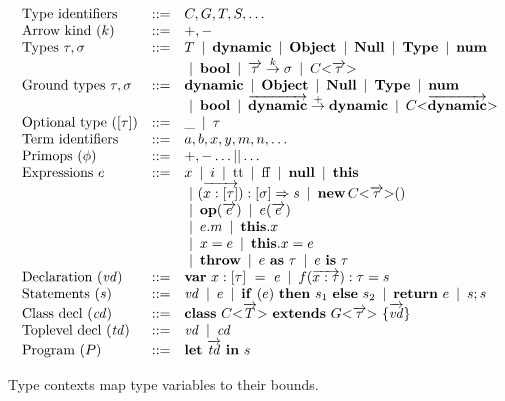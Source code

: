 \documentclass[fleqn, draft]{article}
\newcommand{\Arrow}[3][-]{#2 \overset{#1}{\rightarrow} #3}
\newcommand{\Bool}{\mathbf{bool}}
\newcommand{\Dynamic}{\mathbf{dynamic}}
\newcommand{\Null}{\mathbf{Null}}
\newcommand{\Num}{\mathbf{num}}
\newcommand{\Object}{\mathbf{Object}}
\newcommand{\TApp}[2]{#1\mathrm{<}#2\mathrm{>}}
\newcommand{\Type}{\mathbf{Type}}
\newcommand{\eassign}[2]{#1 = #2}
\newcommand{\eas}[2]{#1\ \mathbf{as}\ #2}
\newcommand{\ecall}[2]{#1(#2)}
\newcommand{\eff}{\mathrm{ff}}
\newcommand{\eis}[2]{#1\ \mathbf{is}\ #2}
\newcommand{\elambda}[3]{(#1):#2 \Rightarrow #3}
\newcommand{\eload}[2]{#1.#2}
\newcommand{\enew}[3]{\mathbf{new}\,\TApp{#1}{#2}(#3)}
\newcommand{\enull}{\mathbf{null}}
\newcommand{\eprimapp}[2]{\ecall{#1}{#2}}
\newcommand{\eprim}{\kwop{op}}
\newcommand{\eset}[3]{\eassign{#1.#2}{#3}}
\newcommand{\ethis}{\mathbf{this}}
\newcommand{\ethrow}{\mathbf{throw}}
\newcommand{\ett}{\mathrm{tt}}
\newcommand{\kwclass}{\kw{class}}
\newcommand{\kwelse}{\kw{else}}
\newcommand{\kwextends}{\kw{extends}}
\newcommand{\kwif}{\kw{if}}
\newcommand{\kwin}{\kw{in}}
\newcommand{\kwlet}{\kw{let}}
\newcommand{\kwreturn}{\kw{return}}
\newcommand{\kwthen}{\kw{then}}
\newcommand{\kwvar}{\kw{var}}
\newcommand{\dclass}[3]{\kwclass\ #1\ \kwextends\ #2\ \{#3\}}
\newcommand{\dfun}[4]{#2(#3):#1 = #4}
\newcommand{\dvar}[2]{\kwvar\ #1\ =\ #2}
\newcommand{\sifthenelse}[3]{\kwif\ (#1)\ \kwthen\ #2\ \kwelse\ #3}
\newcommand{\sreturn}[1]{\kwreturn\ #1}
\newcommand{\program}[2]{\kwlet\ #1\ \kwin\ #2}
\newcommand{\many}[1]{\overrightarrow{#1}}
\newcommand{\alt}{\ \mathop{|}\ }
\newcommand{\opt}[1]{[#1]}
\begin{document}
\[
\begin{array}{lcl}
\text{Type identifiers} & ::= &  C, G, T, S, \ldots \\
%
\text{Arrow kind ($k$)} & ::= &  +, -\\
%
\text{Types $\tau, \sigma$} & ::= &
 T \alt \Dynamic \alt \Object \alt \Null \alt \Type \alt \Num \\ &&
   \alt \Bool
   \alt \Arrow[k]{\many{\tau}}{\sigma} \alt \TApp{C}{\many{\tau}} \\
%
\text{Ground types $\tau, \sigma$} & ::= &
 \Dynamic \alt \Object \alt \Null \alt \Type \alt \Num \\ &&
   \alt \Bool
   \alt \Arrow[+]{\many{\Dynamic}}{\Dynamic} \alt \TApp{C}{\many{\Dynamic}} \\
%
\text{Optional type ($[\tau]$)} & ::= &  \_ \alt \tau \\
%
\text{Term identifiers} & ::= & a, b, x, y, m, n, \ldots \\
%
\text{Primops ($\phi$)} & ::= & \mathrm{+}, \mathrm{-} \ldots \mathrm{||} \ldots \\
%
\text{Expressions $e$} & ::= & 
 x \alt i \alt \ett \alt \eff \alt \enull \alt \ethis \\&&
   \alt \elambda{\many{x:\opt{\tau}}}{\opt{\sigma}}{s} 
   \alt \enew{C}{\many{\tau}}{} \\&&
   \alt \eprimapp{\eprim}{\many{e}} \alt \ecall{e}{\many{e}} \\&&
   \alt \eload{e}{m} \alt \eload{\ethis}{x} \\&&
   \alt \eassign{x}{e} \alt \eset{\ethis}{x}{e} \\&&
   \alt \ethrow \alt \eas{e}{\tau} \alt \eis{e}{\tau} \\
%
\text{Declaration ($\mathit{vd}$)} & ::= &
   \dvar{x:\opt{\tau}}{e} \alt \dfun{\tau}{f}{\many{x:\tau}}{s} \\
%
\text{Statements ($s$)} & ::= & \mathit{vd} \alt e \alt \sifthenelse{e}{s_1}{s_2} 
   \alt \sreturn{e} \alt s;s \\
%
\text{Class decl ($\mathit{cd}$)} & ::= & \dclass{\TApp{C}{\many{T}}}{\TApp{G}{\many{\tau}}}{\many{\mathit{vd}}} \\
%
\text{Toplevel decl ($\mathit{td}$)} & ::= & \mathit{vd} \alt \mathit{cd}\\
%
\text{Program ($P$)} & ::= & \program{\many{\mathit{td}}}{s}
\end{array}
\]


Type contexts map type variables to their bounds.
\end{document}
